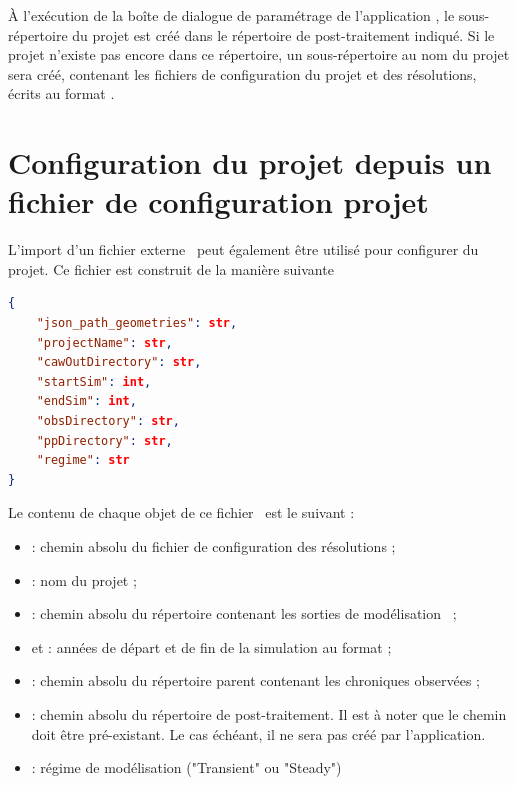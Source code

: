 À l'exécution de la boîte de dialogue de paramétrage de l'application \cwv, le
sous-répertoire du projet est créé dans le répertoire de post-traitement indiqué.
Si le projet n'existe pas encore dans ce répertoire, un sous-répertoire au nom
du projet sera créé, contenant les fichiers de configuration du projet et des résolutions,
écrits au format .

\section{Configuration du projet depuis un fichier de configuration projet \json}
\label{sec-json_config_project}

L'import d'un fichier externe \json~peut également être utilisé pour configurer
du projet. Ce fichier est construit de la manière suivante

\begin{lstlisting}[language=json]
{
    "json_path_geometries": str,
    "projectName": str, 
    "cawOutDirectory": str,
    "startSim": int,
    "endSim": int,
    "obsDirectory": str,
    "ppDirectory": str, 
    "regime": str
}
\end{lstlisting}

\vspace{-0.6cm}
Le contenu de chaque objet de ce fichier \json~est le suivant :
\begin{itemize}
    \item {} : chemin absolu du fichier de
        configuration des résolutions ;

    \item {} : nom du projet ;

    \item {} : chemin absolu du répertoire contenant les
        sorties de modélisation \cawaqs~;

    \item {} et  : années de départ et de fin de la simulation
        au format  ;

    \item {} : chemin absolu du répertoire parent contenant les
        chroniques observées ;

    \item {} : chemin absolu du répertoire de post-traitement. Il
        est à noter que le chemin doit être pré-existant. Le cas échéant, il ne sera
        pas créé par l'application.

    \item {} : régime de modélisation ("Transient" ou "Steady")
\end{itemize}